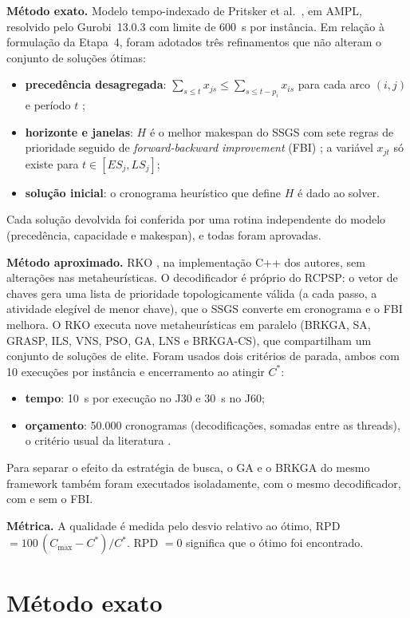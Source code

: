 \documentclass[11pt,a4paper]{article}
\newcommand{\cmax}{C_{\max}}
\begin{document}
\textbf{Método exato.} Modelo tempo-indexado de Pritsker et al.\ \cite{pritsker}, em AMPL,
resolvido pelo Gurobi~13.0.3 com limite de 600~s por instância. Em relação à formulação da
Etapa~4, foram adotados três refinamentos que não alteram o conjunto de soluções ótimas:
\begin{itemize}
  \item \textbf{precedência desagregada}: $\sum_{s \le t} x_{js} \le \sum_{s \le t-p_i} x_{is}$ para
        cada arco $(i,j)$ e período $t$ \cite{christofides};
  \item \textbf{horizonte e janelas}: $H$ é o melhor makespan do SSGS com sete regras de prioridade
        seguido de \emph{forward-backward improvement} (FBI) \cite{valls}; a variável $x_{jt}$ só
        existe para $t \in [ES_j, LS_j]$;
  \item \textbf{solução inicial}: o cronograma heurístico que define $H$ é dado ao solver.
\end{itemize}
Cada solução devolvida foi conferida por uma rotina independente do modelo (precedência, capacidade
e makespan), e todas foram aprovadas.

\textbf{Método aproximado.} RKO \cite{rko}, na implementação C++ dos autores, sem alterações nas
metaheurísticas. O decodificador é próprio do RCPSP: o vetor de chaves gera uma lista de prioridade
topologicamente válida (a cada passo, a atividade elegível de menor chave), que o SSGS converte em
cronograma e o FBI melhora. O RKO executa nove metaheurísticas em paralelo (BRKGA, SA, GRASP, ILS,
VNS, PSO, GA, LNS e BRKGA-CS), que compartilham um conjunto de soluções de elite. Foram usados dois
critérios de parada, ambos com 10 execuções por instância e encerramento ao atingir $C^*$:
\begin{itemize}
  \item \textbf{tempo}: 10~s por execução no J30 e 30~s no J60;
  \item \textbf{orçamento}: 50.000 cronogramas (decodificações, somadas entre as threads), o
        critério usual da literatura \cite{kolisch}.
\end{itemize}
Para separar o efeito da estratégia de busca, o GA e o BRKGA \cite{brkga} do mesmo framework também
foram executados isoladamente, com o mesmo decodificador, com e sem o FBI.

\textbf{Métrica.} A qualidade é medida pelo desvio relativo ao ótimo,
RPD $= 100\,(\cmax - C^*)/C^*$. RPD $= 0$ significa que o ótimo foi encontrado.

\section{Método exato}\label{sec:exato}
\end{document}

